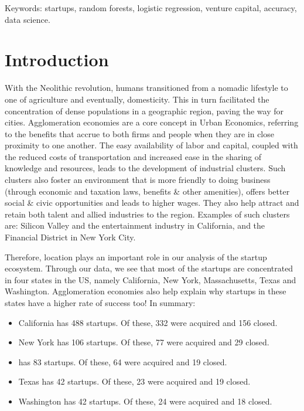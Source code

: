 \documentclass[
]{article}
\begin{document}
Keywords: startups, random forests, logistic regression, venture
capital, accuracy, data science.

\hypertarget{introduction}{%
\section{Introduction}\label{introduction}}

With the Neolithic revolution, humans transitioned from a nomadic
lifestyle to one of agriculture and eventually, domesticity. This in
turn facilitated the concentration of dense populations in a geographic
region, paving the way for cities. Agglomeration economies are a core
concept in Urban Economics, referring to the benefits that accrue to
both firms and people when they are in close proximity to one another.
The easy availability of labor and capital, coupled with the reduced
costs of transportation and increased ease in the sharing of knowledge
and resources, leads to the development of industrial clusters. Such
clusters also foster an environment that is more friendly to doing
business (through economic and taxation laws, benefits \& other
amenities), offers better social \& civic opportunities and leads to
higher wages. They also help attract and retain both talent and allied
industries to the region. Examples of such clusters are: Silicon Valley
and the entertainment industry in California, and the Financial District
in New York City.

Therefore, location plays an important role in our analysis of the
startup ecosystem. Through our data, we see that most of the startups
are concentrated in four states in the US, namely California, New York,
Massachusetts, Texas and Washington. Agglomeration economies also help
explain why startups in these states have a higher rate of success too!
In summary:

\begin{itemize}
\item
  California has 488 startups. Of these, 332 were acquired and 156
  closed.
\item
  New York has 106 startups. Of these, 77 were acquired and 29 closed.
\item
  has 83 startups. Of these, 64 were acquired and 19 closed.
\item
  Texas has 42 startups. Of these, 23 were acquired and 19 closed.
\item
  Washington has 42 startups. Of these, 24 were acquired and 18 closed.
\end{itemize}
\end{document}
